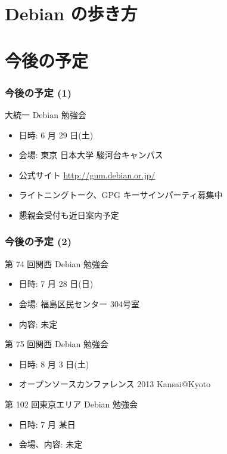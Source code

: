 \documentclass[cjk,dvipdfmx,10pt,compress,%
hyperref={bookmarks=true,bookmarksnumbered=true,bookmarksopen=false,%
colorlinks=false,%
pdftitle={第 72 回 関西 Debian 勉強会},%
pdfauthor={倉敷・のがた・佐々木・かわだ・八津尾},%
pdfsubject={資料},%
}]{beamer}
\begin{document}
\section{Debian の歩き方}


\section{今後の予定}
\begin{frame}[fragile]
\frametitle{今後の予定 (1)}

\begin{block}{大統一 Debian 勉強会}
  \begin{itemize}
  \item 日時: 6 月 29 日(土)
  \item 会場: 東京 日本大学 駿河台キャンパス
  \item 公式サイト \url{http://gum.debian.or.jp/}
  \item ライトニングトーク、GPG キーサインパーティ募集中
  \item 懇親会受付も近日案内予定
  \end{itemize}
\end{block}
\end{frame}

\begin{frame}[fragile]
\frametitle{今後の予定 (2)}

\begin{block}{第 74 回関西 Debian 勉強会}
  \begin{itemize}
  \item 日時: 7 月 28 日(日)
  \item 会場: 福島区民センター 304号室
  \item 内容: 未定
  \end{itemize}
\end{block}

\begin{block}{第 75 回関西 Debian 勉強会}
  \begin{itemize}
  \item 日時: 8 月 3 日(土)
  \item オープンソースカンファレンス 2013 Kansai@Kyoto
  \end{itemize}
\end{block}

\begin{block}{第 102 回東京エリア Debian 勉強会}
  \begin{itemize}
  \item 日時: 7 月 某日
  \item 会場、内容: 未定
  \end{itemize}
\end{block}

\end{frame}

\takahashi[50]{  }
\end{document}
